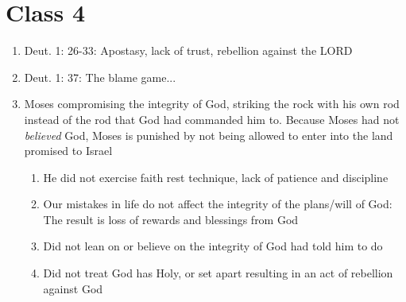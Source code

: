 \documentclass[11pt]{article}
\begin{document}
\section*{Class 4}
\begin{enumerate}
	\item Deut. 1: 26-33: Apostasy, lack of trust, rebellion against the LORD
	\item Deut. 1: 37: The blame game...
	\item Moses compromising the integrity of God, striking the rock with his own rod instead of the rod that God had commanded him to. Because Moses had not \emph{believed} God, Moses is punished by not being allowed to enter into the land promised to Israel
	\begin{enumerate}
		\item He did not exercise faith rest technique, lack of patience and discipline
		\item Our mistakes in life do not affect the integrity of the plans/will of God: The result is loss of rewards and blessings from God
		\item Did not lean on or believe on the integrity of God had told him to do
		\item Did not treat God has Holy, or set apart resulting in an act of rebellion against God
	\end{enumerate}
\end{enumerate}
\end{document}
